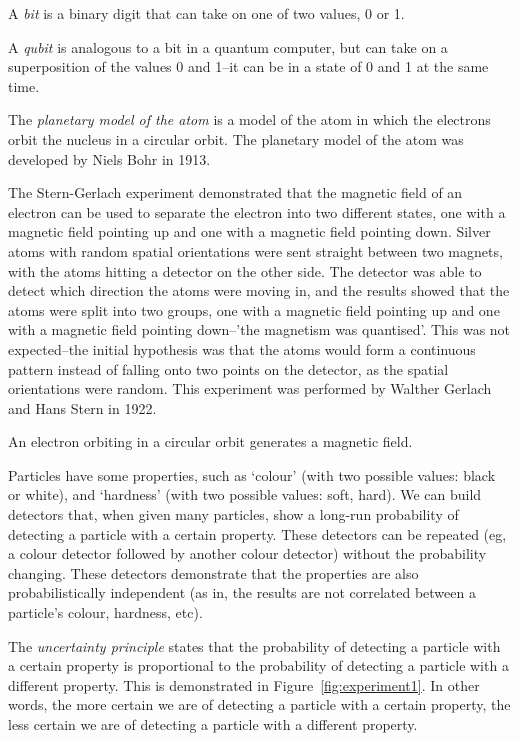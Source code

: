 
\begin{definition}
    A \emph{bit} is a binary digit that can take on one of two values, 0 or 1.
\end{definition}
\begin{definition}
    A \emph{qubit} is analogous to a bit in a quantum computer, but can take on a superposition of the values 0 and 1–it can be in a state of 0 and 1 at the same time.
\end{definition}
\begin{definition}
    The \emph{planetary model of the atom} is a model of the atom in which the electrons orbit the nucleus in a circular orbit. The planetary model of the atom was developed by Niels Bohr in 1913.
\end{definition}
The Stern-Gerlach experiment demonstrated that the magnetic field of an electron can be used to separate the electron into two different states, one with a magnetic field pointing up and one with a magnetic field pointing down. Silver atoms with random spatial orientations were sent straight between two magnets, with the atoms hitting a detector on the other side. The detector was able to detect which direction the atoms were moving in, and the results showed that the atoms were split into two groups, one with a magnetic field pointing up and one with a magnetic field pointing down–'the magnetism was quantised'. This was not expected–the initial hypothesis was that the atoms would form a continuous pattern instead of falling onto two points on the detector, as the spatial orientations were random. This experiment was performed by Walther Gerlach and Hans Stern in 1922.
\begin{note}
    An electron orbiting in a circular orbit generates a magnetic field.
\end{note}
Particles have some properties, such as `colour' (with two possible values: black or white), and `hardness' (with two possible values: soft, hard). We can build detectors that, when given many particles, show a long-run probability of detecting a particle with a certain property. These detectors can be repeated (eg, a colour detector followed by another colour detector) without the probability changing. These detectors demonstrate that the properties are also probabilistically independent (as in, the results are not correlated between a particle's colour, hardness, etc).

\begin{definition}
    The \emph{uncertainty principle} states that the probability of detecting a particle with a certain property is proportional to the probability of detecting a particle with a different property. This is demonstrated in Figure~\ref{fig:experiment1}. In other words, the more certain we are of detecting a particle with a certain property, the less certain we are of detecting a particle with a different property.
\end{definition}

